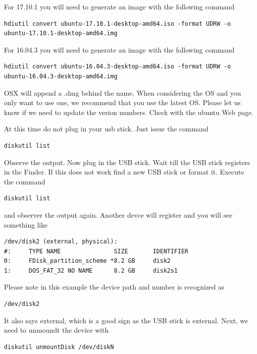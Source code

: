 For 17.10.1 you will need to generate an image with the following
command

\begin{lstlisting}
hdiutil convert ubuntu-17.10.1-desktop-amd64.iso -format UDRW -o ubuntu-17.10.1-desktop-amd64.img
\end{lstlisting}

For 16.04.3 you will need to generate an image with the following
command

\begin{lstlisting}
hdiutil convert ubuntu-16.04.3-desktop-amd64.iso -format UDRW -o ubuntu-16.04.3-desktop-amd64.img
\end{lstlisting}

OSX will append a .dmg behind the name. When considering the OS and you
only want to use one, we recommend that you use the latest OS. Please
let us know if we need to update the verion numbers. Check with the
ubuntu Web page.

At this time do not plug in your usb stick. Just issue the command

\begin{lstlisting}
diskutil list
\end{lstlisting}

Observe the output. Now plug in the USB stick. Wait till the USB stick
registers in the Finder. If this does not work find a new USB stick or
format it. Execute the command

\begin{lstlisting}
diskutil list
\end{lstlisting}

and observer the output again. Another devce will register and you will
see something like

\begin{lstlisting}
/dev/disk2 (external, physical):
#:     TYPE NAME               SIZE       IDENTIFIER
0:     FDisk_partition_scheme *8.2 GB     disk2
1:     DOS_FAT_32 NO NAME      8.2 GB     disk2s1
\end{lstlisting}

Please note in this example the device path and number is recognized as

\begin{lstlisting}
/dev/disk2
\end{lstlisting}

It also says external, which is a good sign as the USB stick is
external. Next, we need to unmoundt the device with

\begin{lstlisting}
diskutil unmountDisk /dev/diskN
\end{lstlisting}

